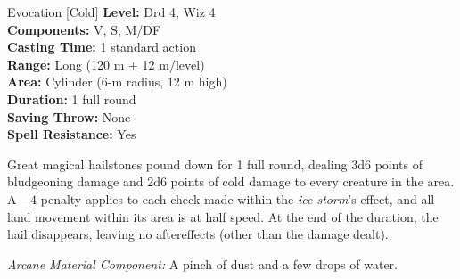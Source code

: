 {Evocation [Cold]}
{
	\textbf{Level:}
	Drd 4, Wiz 4\\
	\textbf{Components:}
	V, S, M/DF\\
	\textbf{Casting Time:}
	1 standard action\\
	\textbf{Range:}
	Long (120 m + 12 m/level)\\
	\textbf{Area:}
	Cylinder (6-m radius, 12 m high)\\
	\textbf{Duration:}
	1 full round\\
	\textbf{Saving Throw:}
	None\\
	\textbf{Spell Resistance:}
	Yes\\
}
{
	Great magical hailstones pound down for 1 full round, dealing 3d6 points of bludgeoning damage and 2d6 points of cold damage to every creature in the area. A $-4$ penalty applies to each  check made within the \emph{ice storm}'s effect, and all land movement within its area is at half speed. At the end of the duration, the hail disappears, leaving no aftereffects (other than the damage dealt).

	\textit{Arcane Material Component:}
	A pinch of dust and a few drops of water.

}
